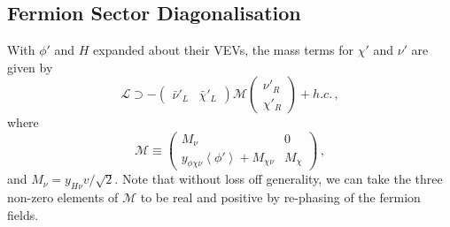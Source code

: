 \documentclass[aps, prd, reprint, nofootinbib, amsmath, amssymb, floatfix]{revtex4-2}
\newcommand{\vev}[1]{\left< #1 \right>}      %
\begin{document}

\subsection{Fermion Sector Diagonalisation}

With $\phi'$ and $H$ expanded about their VEVs, the mass terms for $\chi'$ and $\nu'$ are given by
%
\begin{equation}
    \mathcal{L} \supset -
    \begin{pmatrix}
        \bar{\nu}'_L & \bar{\chi}'_L 
    \end{pmatrix}
    \mathcal{M}
    \begin{pmatrix}
        \nu'_R \\ \chi'_R
    \end{pmatrix} + h.c. \,,
\end{equation}
%
where
%
\begin{equation}\label{eq:MMatrix3x3}
    \mathcal{M} \equiv \begin{pmatrix}
        M_\nu & 0 \\
        y_{\phi \chi \nu} \vev{\phi'} + M_{\chi\nu} & M_\chi
    \end{pmatrix} \,,
\end{equation}
%
and $M_\nu = y_{H\nu}v/\sqrt{2}$. Note that without loss off generality, we can take the three non-zero elements of $\mathcal{M}$ to be real and positive by re-phasing of the fermion fields.
\end{document}
